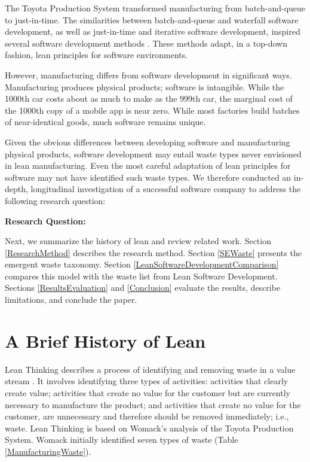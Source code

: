 The Toyota Production System \cite{OhnoToyotaProductionSystem, ShingoToyotaProductionSystem} transformed manufacturing from batch-and-queue to just-in-time. The similarities between batch-and-queue and waterfall software development, as well as just-in-time and iterative software development, inspired several software development methods \cite{PoppendieckLeanSoftwareDevelopment, AndersonKanban}. These methods adapt, in a top-down fashion, lean principles for software environments. 

However, manufacturing differs from software development in significant ways. Manufacturing produces physical products; software is intangible. While the 1000th car costs about as much to make as the 999th car, the marginal cost of the 1000th copy of a mobile app is near zero. While most factories build batches of near-identical goods, much software remains unique. 

Given the obvious differences between developing software and manufacturing physical products, software development may entail waste types never envisioned in lean manufacturing. Even the most careful adaptation of lean principles for software may not have identified such waste types. We therefore conducted an in-depth, longitudinal investigation of a successful software company to address the following research question: 

\textbf{Research Question: }

Next, we summarize the history of lean and review related work. Section \ref{ResearchMethod} describes the research method. Section \ref{SEWaste} presents the emergent waste taxonomy. Section \ref{LeanSoftwareDevelopmentComparison} compares this model with the waste list from Lean Software Development. Sections \ref{ResultsEvaluation} and \ref{Conclusion} evaluate the results, describe limitations, and conclude the paper.

\section{A Brief History of Lean}
\label{HistoryOfLean}
Lean Thinking describes a process of identifying and removing waste in a value stream \cite{WomackLeanThinking}. It involves identifying three types of activities: activities that clearly create value; activities that create no value for the customer but are currently necessary to manufacture the product; and activities that create no value for the customer, are unnecessary and therefore should be removed immediately; i.e., waste. Lean Thinking is based on Womack's analysis of the Toyota Production System. Womack initially identified seven types of waste (Table \ref{ManufacturingWaste}). 

